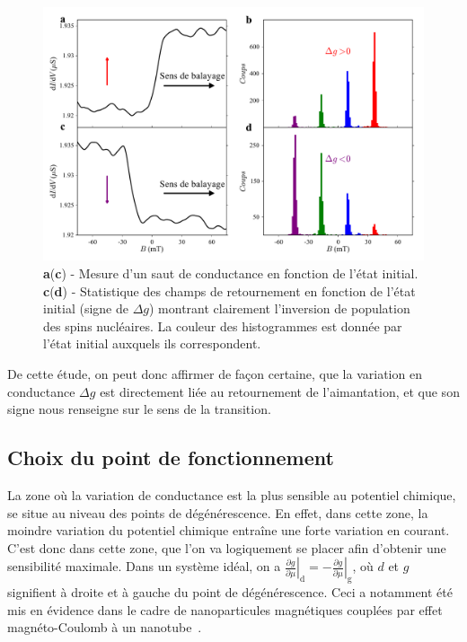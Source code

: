 \begin{figure}
\includegraphics[scale=0.45]{Resultats/JumpSens/JumpSens.pdf} 
\caption{\textbf{a}(\textbf{c}) - Mesure d'un saut de conductance en fonction de l'état initial. \textbf{c}(\textbf{d}) - Statistique des champs de retournement en fonction de l'état initial (signe de $\Delta g$) montrant clairement l'inversion de population des spins nucléaires. La couleur des histogrammes est donnée par l'état initial auxquels ils correspondent.}
\label{analyse_signe_saut}
\end{figure}

De cette étude, on peut donc affirmer de façon certaine, que la variation en conductance $\Delta g$ est directement liée au retournement de l'aimantation, et que son signe nous renseigne sur le sens de la transition.


\subsection{Choix du point de fonctionnement}
La zone où la variation de conductance est la plus sensible au potentiel chimique, se situe au niveau des points de dégénérescence. En effet, dans cette zone, la moindre variation du potentiel chimique entraîne une forte variation en courant. C'est donc dans cette zone, que l'on va logiquement se placer afin d'obtenir une sensibilité maximale. Dans un système idéal, on a $\left. \frac{\partial g}{\partial \mu}\right|_{\text{d}} = \left. -\frac{\partial g}{\partial \mu}\right|_{\text{g}}$, où $d$ et $g$ signifient à droite et à gauche du point de dégénérescence. Ceci a notamment été mis en évidence dans le cadre de nanoparticules magnétiques couplées par effet magnéto-Coulomb à un nanotube~\cite{Datta2011}.

